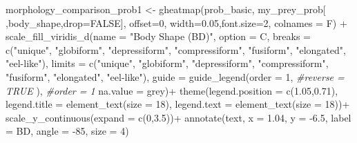 \documentclass[
]{article}
\newenvironment{Shaded}{\begin{snugshade}}{\end{snugshade}}
\newcommand{\AttributeTok}[1]{\textcolor[rgb]{0.77,0.63,0.00}{#1}}
\newcommand{\CommentTok}[1]{\textcolor[rgb]{0.56,0.35,0.01}{\textit{#1}}}
\newcommand{\ConstantTok}[1]{\textcolor[rgb]{0.00,0.00,0.00}{#1}}
\newcommand{\DecValTok}[1]{\textcolor[rgb]{0.00,0.00,0.81}{#1}}
\newcommand{\FloatTok}[1]{\textcolor[rgb]{0.00,0.00,0.81}{#1}}
\newcommand{\FunctionTok}[1]{\textcolor[rgb]{0.00,0.00,0.00}{#1}}
\newcommand{\NormalTok}[1]{#1}
\newcommand{\OtherTok}[1]{\textcolor[rgb]{0.56,0.35,0.01}{#1}}
\newcommand{\SpecialCharTok}[1]{\textcolor[rgb]{0.00,0.00,0.00}{#1}}
\newcommand{\StringTok}[1]{\textcolor[rgb]{0.31,0.60,0.02}{#1}}
\begin{document}
\begin{Shaded}
\begin{Highlighting}[]
\NormalTok{morphology\_comparison\_prob1 }\OtherTok{\textless{}{-}} \FunctionTok{gheatmap}\NormalTok{(prob\_basic, }
\NormalTok{                                        my\_prey\_prob[ ,}\StringTok{\textquotesingle{}body\_shape\textquotesingle{}}\NormalTok{,}\AttributeTok{drop=}\ConstantTok{FALSE}\NormalTok{],}
                                        \AttributeTok{offset=}\DecValTok{0}\NormalTok{, }\AttributeTok{width=}\FloatTok{0.05}\NormalTok{,}\AttributeTok{font.size=}\DecValTok{2}\NormalTok{, }\AttributeTok{colnames =}\NormalTok{ F) }\SpecialCharTok{+}
  \FunctionTok{scale\_fill\_viridis\_d}\NormalTok{(}\AttributeTok{name =} \StringTok{"Body Shape (BD)"}\NormalTok{, }
                       \AttributeTok{option =} \StringTok{\textquotesingle{}C\textquotesingle{}}\NormalTok{,}
                       \AttributeTok{breaks =} \FunctionTok{c}\NormalTok{(}\StringTok{"unique"}\NormalTok{, }\StringTok{"globiform"}\NormalTok{, }\StringTok{"depressiform"}\NormalTok{, }\StringTok{"compressiform"}\NormalTok{,}
                                  \StringTok{"fusiform"}\NormalTok{, }\StringTok{"elongated"}\NormalTok{, }\StringTok{"eel{-}like"}\NormalTok{),}
                       \AttributeTok{limits =} \FunctionTok{c}\NormalTok{(}\StringTok{"unique"}\NormalTok{, }\StringTok{"globiform"}\NormalTok{, }\StringTok{"depressiform"}\NormalTok{, }\StringTok{"compressiform"}\NormalTok{,}
                                  \StringTok{"fusiform"}\NormalTok{, }\StringTok{"elongated"}\NormalTok{, }\StringTok{"eel{-}like"}\NormalTok{),}
                       \AttributeTok{guide =} \FunctionTok{guide\_legend}\NormalTok{(}\AttributeTok{order =} \DecValTok{1}\NormalTok{, }
                                            \CommentTok{\#reverse = TRUE}
\NormalTok{                                            ), }\CommentTok{\#order = 1}
                       \AttributeTok{na.value =} \StringTok{\textquotesingle{}grey\textquotesingle{}}\NormalTok{)}\SpecialCharTok{+}
  \FunctionTok{theme}\NormalTok{(}\AttributeTok{legend.position =} \FunctionTok{c}\NormalTok{(}\FloatTok{1.05}\NormalTok{,}\FloatTok{0.71}\NormalTok{),}
        \AttributeTok{legend.title =} \FunctionTok{element\_text}\NormalTok{(}\AttributeTok{size =} \DecValTok{18}\NormalTok{), }
        \AttributeTok{legend.text =} \FunctionTok{element\_text}\NormalTok{(}\AttributeTok{size =} \DecValTok{18}\NormalTok{))}\SpecialCharTok{+}
  \FunctionTok{scale\_y\_continuous}\NormalTok{(}\AttributeTok{expand =} \FunctionTok{c}\NormalTok{(}\DecValTok{0}\NormalTok{,}\FloatTok{3.5}\NormalTok{))}\SpecialCharTok{+}
  \FunctionTok{annotate}\NormalTok{(}\StringTok{\textquotesingle{}text\textquotesingle{}}\NormalTok{, }\AttributeTok{x =} \FloatTok{1.04}\NormalTok{, }\AttributeTok{y =} \SpecialCharTok{{-}}\FloatTok{6.5}\NormalTok{, }\AttributeTok{label =} \StringTok{\textquotesingle{}BD\textquotesingle{}}\NormalTok{, }\AttributeTok{angle =} \SpecialCharTok{{-}}\DecValTok{85}\NormalTok{, }\AttributeTok{size =} \DecValTok{4}\NormalTok{)}


\end{Highlighting}
\end{Shaded}
\end{document}
